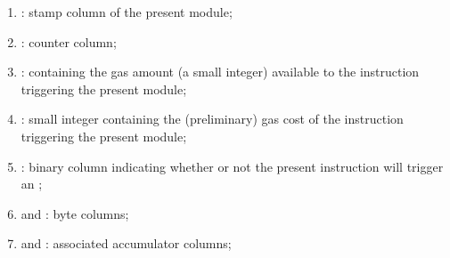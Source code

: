 \begin{enumerate}
	\item \gasStamp:
		stamp column of the present module;
	\item \ct:
		counter column; 
	\item \gasActual: \godGiven{}
		\ccc{} containing the gas amount (a small integer) available to the instruction triggering the present module; 
	\item \gasCost: \godGiven{}
		small integer containing the (preliminary) gas cost of the instruction triggering the present module;
	\item \oogx: \godGiven{}
		binary column indicating whether or not the present instruction will trigger an \oogxSH{};
	\item {} and :
		byte columns;
	\item {} and :
		associated accumulator columns;
\end{enumerate}
